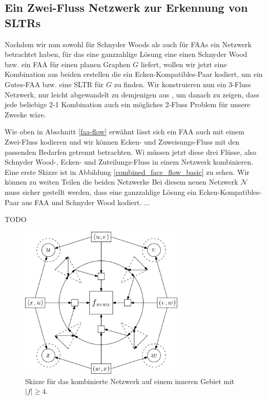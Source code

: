 

\subsection{Ein Zwei-Fluss Netzwerk zur Erkennung von SLTRs}

Nachdem wir nun sowohl für Schnyder Woods als auch für FAAs ein Netzwerk betrachtet haben, für das eine ganzzahlige Lösung eine einen Schnyder Wood bzw. ein FAA für einen planen Graphen $G$ liefert, wollen wir jetzt eine Kombination aus beiden erstellen die ein Ecken-Kompatibles-Paar kodiert, um ein Gutes-FAA bzw. eine SLTR für $G$ zu finden. Wir konstruieren nun ein 3-Fluss Netzwerk, nur leicht abgewandelt zu demjenigen aus \cite{af15}, um danach zu zeigen, dass jede beliebige 2-1 Kombination auch ein mögliches 2-Fluss Problem für unsere Zwecke wäre.\

Wie oben in Abschnitt \ref{faa-flow} erwähnt lässt sich ein FAA auch mit einem Zwei-Fluss kodieren und wir können Ecken- und Zuweisungs-Fluss mit den passenden Bedarfen getrennt betrachten. Wi müssen jetzt diese drei Flüsse, also Schnyder Wood-, Ecken- und Zuteilungs-Fluss in einem Netzwerk kombinieren. Eine erste Skizze ist in Abbildung \ref{combined_face_flow_basic} zu sehen. Wir können zu weiten Teilen die beiden Netzwerke 
Bei diesem neuen Netzwerk $\mathcal{N}$ muss sicher gestellt werden, dass eine ganzzahlige Lösung ein Ecken-Kompatibles-Paar aus FAA und Schnyder Wood kodiert. ... 

TODO 

\begin{figure}[h]
	\centering
  	\includegraphics[width=0.7\textwidth]{combined_face_sketch.png}
  	\caption{Skizze für das kombinierte Netzwerk auf einem inneren Gebiet mit $|f| \geq 4$.}
\end{figure}